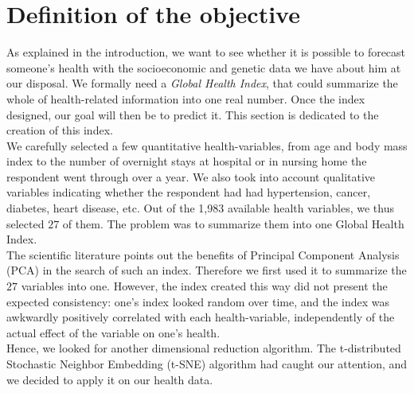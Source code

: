 \documentclass[]{article}
\begin{document}
\section{Definition of the objective}
As explained in the introduction, we want to see whether it is possible to forecast someone's health with the socioeconomic and genetic data we have about him at our disposal. We formally need a \textit{Global Health Index}, that could summarize the whole of health-related information into one real number. Once the index designed, our goal will then be to predict it. This section is dedicated to the creation of this index.\\

\noindent
We carefully selected a few quantitative health-variables, from age and body mass index to the number of overnight stays at hospital or in nursing home the respondent went through over a year. We also took into account qualitative variables indicating whether the respondent had had hypertension, cancer, diabetes, heart disease, etc. Out of the 1,983 available health variables, we thus selected $27$ of them. The problem was to summarize them into one Global Health Index.\\

\noindent
The scientific literature points out the benefits of Principal Component Analysis (PCA) \cite{pca1901} in the search of such an index. Therefore we first used it to summarize the $27$ variables into one. However, the index created this way did not present the expected consistency: one's index looked random over time, and the index was awkwardly positively correlated with each health-variable, independently of the actual effect of the variable on one's health.\\

\noindent
Hence, we looked for another dimensional reduction algorithm. The t-distributed Stochastic Neighbor Embedding (t-SNE) algorithm \cite{tSNE2008} had caught our attention, and we decided to apply it on our health data.
\end{document}
